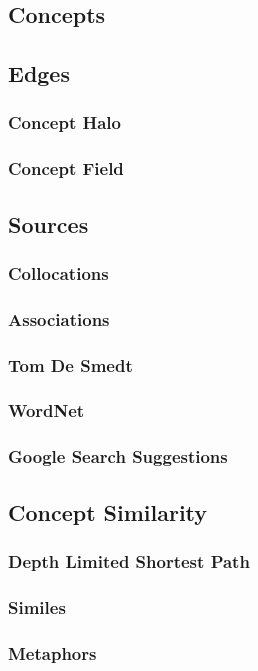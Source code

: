 \subsection{Concepts}
\subsection{Edges}
\subsubsection{Concept Halo}
\subsubsection{Concept Field}


\subsection{Sources}
\subsubsection{Collocations}
\subsubsection{Associations}
\subsubsection{Tom De Smedt}
\subsubsection{WordNet}
\subsubsection{Google Search Suggestions}


\subsection{Concept Similarity}
\subsubsection{Depth Limited Shortest Path}
\subsubsection{Similes}
\subsubsection{Metaphors}
